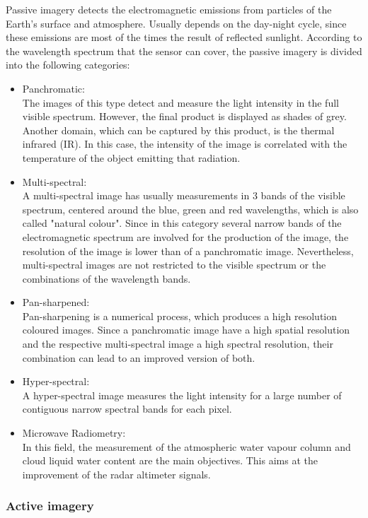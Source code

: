 Passive imagery detects the electromagnetic emissions from particles of the Earth's surface and atmosphere. Usually depends on the day-night cycle, since these emissions are most of the times the result of reflected sunlight. According to the wavelength spectrum that the sensor can cover, the passive imagery is divided into the following categories:
\begin{itemize}
\item Panchromatic: \\
The images of this type detect and measure the light intensity in the full visible spectrum. However, the final product is displayed as shades of grey. Another domain, which can be captured by this product, is the thermal infrared (IR). In this case, the intensity of the image is correlated with the temperature of the object emitting that radiation.
\item Multi-spectral: \\
A multi-spectral image has usually measurements in 3 bands of the visible spectrum, centered around the blue, green and red wavelengths, which is also called "natural colour". Since in this category several narrow bands of the electromagnetic spectrum are involved for the production of the image, the resolution of the image is lower than of a panchromatic image. Nevertheless, multi-spectral images are not restricted to the visible spectrum or the combinations of the wavelength bands.
\item Pan-sharpened: \\
Pan-sharpening is a numerical process, which produces a high resolution coloured images. Since a panchromatic image have a high spatial resolution and the respective multi-spectral image a high spectral resolution, their combination can lead to an improved version of both.
\item Hyper-spectral: \\
A hyper-spectral image measures the light intensity for a large number of contiguous narrow spectral bands for each pixel.
\item Microwave Radiometry: \\
In this field, the measurement of the atmospheric water vapour column and cloud liquid water content are the main objectives. This aims at the improvement of the radar altimeter signals.
\end{itemize}

\bigskip
\subsubsection{Active imagery}
\bigskip

